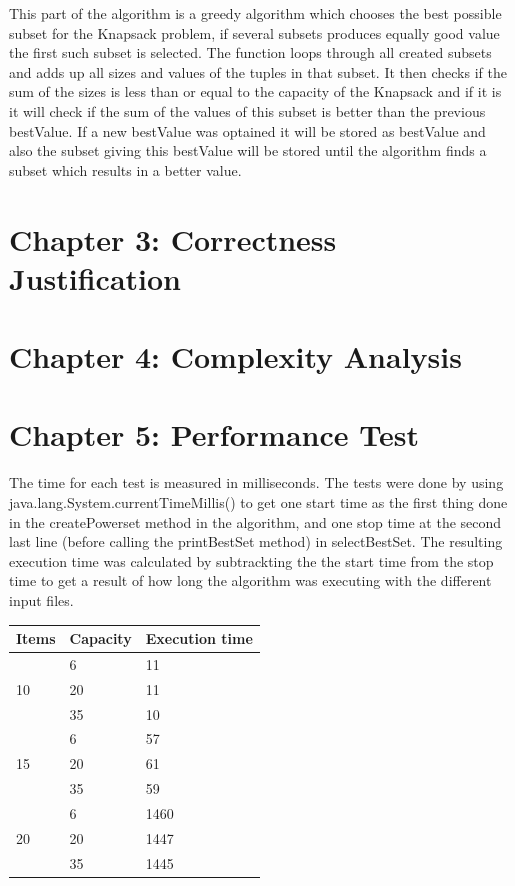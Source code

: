 \documentclass{article}
\begin{document}
\noindent This part of the algorithm is a greedy algorithm which chooses the best possible subset for the Knapsack problem, if several subsets produces equally good value the first such subset is selected. The function loops through all created subsets and adds up all sizes and values of the tuples in that subset. It then checks if the sum of the sizes is less than or equal to the capacity of the Knapsack and if it is it will check if the sum of the values of this subset is better than the previous bestValue. If a new bestValue was optained it will be stored as bestValue and also the subset giving this bestValue will be stored until the algorithm finds a subset which results in a better value.\\

\section*{Chapter 3: Correctness Justification}

\section*{Chapter 4: Complexity Analysis}

\section*{Chapter 5: Performance Test}

The time for each test is measured in milliseconds. The tests were done by using java.lang.System.currentTimeMillis() to get one start time as the first thing done in the createPowerset method in the algorithm, and one stop time at the second last line (before calling the printBestSet method) in selectBestSet. The resulting execution time was calculated by subtrackting the the start time from the stop time to get a result of how long the algorithm was executing with the different input files.\\

\begin{tabular}{|l|l|l|} \hline
Items &Capacity &Execution time\\ \hline
\multirow{3}{*}{10} & 6 & 11 \\
& 20 & 11 \\
& 35 & 10 \\ \hline
\multirow{3}{*}{15} & 6 & 57 \\
& 20 & 61 \\
& 35 & 59 \\ \hline
\multirow{3}{*}{20} & 6 & 1460 \\
& 20 & 1447 \\
& 35 & 1445 \\ \hline
\end{tabular}
\end{document}
